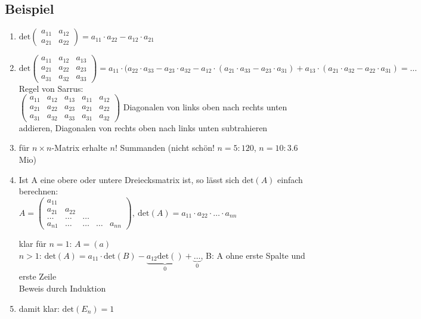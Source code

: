 \subsection{Beispiel}
\begin{enumerate}
	\item
	$\mathrm{det}\begin{pmatrix}a_{11} & a_{12} \\ a_{21} & a_{22}\end{pmatrix}=a_{11}\cdot a_{22}-a_{12}\cdot a_{21}$
	
	\item
	$\mathrm{det}\begin{pmatrix}a_{11} & a_{12} & a_{13} \\ a_{21} & a_{22} & a_{23} \\ a_{31} & a_{32} & a_{33}\end{pmatrix} = a_{11}\cdot (a_{22}\cdot a_{33}-a_{23}\cdot a_{32} -a_{12}\cdot (a_{21}\cdot a_{33}-a_{23}\cdot a_{31}) + a_{13}\cdot (a_{21}\cdot a_{32}-a_{22}\cdot a_{31}) = \dots$\\
	Regel von Sarrus:\\
	$\begin{pmatrix}a_{11} & a_{12} & a_{13} & a_{11} & a_{12}\\ a_{21} & a_{22} & a_{23} & a_{21} & a_{22} \\ a_{31} & a_{32} & a_{33} & a_{31} & a_{32}\end{pmatrix}$ Diagonalen von links oben nach rechts unten addieren, Diagonalen von rechts oben nach links unten subtrahieren
	
	\item
	für $n\times n$-Matrix erhalte $n!$ Summanden (nicht schön! $n=5: 120$, $n=10: 3.6$Mio)
	
	\item
	Ist A eine obere oder untere Dreiecksmatrix ist, so lässt sich $\mathrm{det}(A)$ einfach berechnen:\\
	$A=\begin{pmatrix}a_{11} \\ a_{21} & a_{22} \\ \dots & \dots & \dots \\ a_{n1} & \dots & \dots & \dots & a_{nn}\end{pmatrix}, \ \mathrm{det}(A)=a_{11}\cdot a_{22}\cdot \dots\cdot a_{nn}$
	
	klar für $n=1$: $A=(a)$\\
	$n>1$: $\mathrm{det}(A)= a_{11}\cdot \mathrm{det}(B)-\underbrace{a_{12}\mathrm{det}( )}_{0} +\underbrace{\dots}_{0}$, B: A ohne erste Spalte und erste Zeile\\
	Beweis durch Induktion
	
	\item
	damit klar: $\mathrm{det}(E_n)=1$
\end{enumerate}

